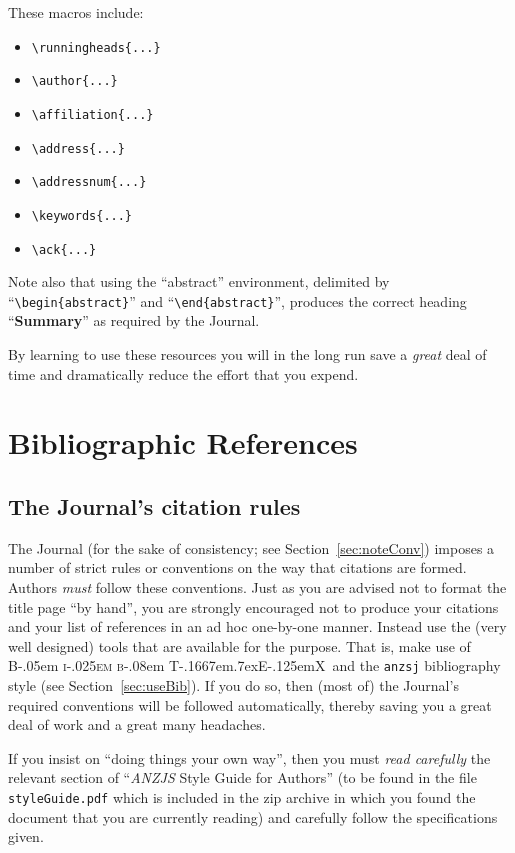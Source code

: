 \documentclass[times, doublespace]{anzsauth}
\newcommand\BibTeX{{\rmfamily B\kern-.05em \textsc{i\kern-.025em b}\kern-.08em
T\kern-.1667em\lower.7ex\hbox{E}\kern-.125emX}}
\begin{document}
These macros include:
\begin{itemize}
\item \verb!\runningheads{...}!
\item \verb!\author{...}!
\item \verb!\affiliation{...}!
\item \verb!\address{...}!
\item \verb!\addressnum{...}!
\item \verb!\keywords{...}!
\item \verb!\ack{...}!
\end{itemize}
Note also that using the ``abstract'' environment, delimited by
``\verb!\begin{abstract}!'' and ``\verb!\end{abstract}!'',
produces the correct heading ``\textbf{Summary}'' as required by
the Journal.

By learning to use these resources you will in the long
run save a \emph{great} deal of time and dramatically reduce the
effort that you expend.

\section{Bibliographic References}
\label{sec:bibRef}

\subsection{The Journal's citation rules}
\label{sec:citeRules}

The Journal (for the sake of consistency; see
Section~\ref{sec:noteConv}) imposes a number of strict rules
or conventions on the way that citations are formed.  Authors
\emph{must} follow these conventions.  Just as you are advised not
to format the title page ``by hand'', you are strongly encouraged not
to produce your citations and your list of references in an ad hoc
one-by-one manner.  Instead use the (very well designed) tools that
are available for the purpose.  That is, make use of \BibTeX\ and
the \texttt{anzsj} bibliography style (see Section~\ref{sec:useBib}).
If you do so, then (most of) the Journal's required conventions will
be followed automatically, thereby saving you a great deal of work
and a great many headaches.

If you insist on ``doing things your own way'',
then you must \emph{read carefully} the relevant section of
``\textit{ANZJS} Style Guide for Authors'' (to be found in the
file \texttt{styleGuide.pdf} which is included in the zip archive
in which you found the document that you are currently reading)
and carefully follow the specifications given.
\end{document}
